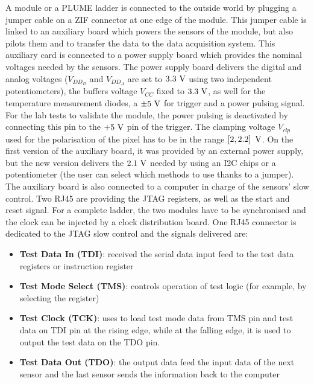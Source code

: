   A module or a PLUME ladder is connected to the outside world by plugging a jumper cable on a ZIF connector at one edge of the module.
  This jumper cable is linked to an auxiliary board which powers the sensors of the module, but also pilots them and to transfer the data to the data acquisition system.
  This auxiliary card is connected to a power supply board which provides the nominal voltages needed by the sensors.
  The power supply board delivers the digital and analog voltages ($V_{DD_D}$ and $V_{DD_A}$ are set to $3.3~\rm{V}$ using two independent potentiometers), the buffers voltage $V_{CC}$ fixed to $3.3~\rm{V}$, as well for the temperature measurement diodes, a $\pm 5~\rm{V}$ for trigger and a power pulsing signal.
  For the lab tests to validate the module, the power pulsing is deactivated by connecting this pin to the $+5~\rm{V}$ pin of the trigger.
  The clamping voltage $V_{clp}$ used for the polarisation of the pixel has to be in the range $\left[2, 2.2\right]~\rm{V}$.
  On the first version of the auxiliary board, it was provided by an external power supply, but the new version delivers the $2.1~\rm{V}$ needed by using an I2C chips or a potentiometer (the user can select which methods to use thanks to a jumper).
  The auxiliary board is also connected to a computer in charge of the sensors' slow control.
  Two RJ45 are providing the \gls{JTAG} registers, as well as the start and reset signal. 
  For a complete ladder, the two modules have to be synchronised and the clock can be injected by a clock distribution board.
  One RJ45 connector is dedicated to the \gls{JTAG} slow control and the signals delivered are: 

  \begin{itemize}
    \item \textbf{Test Data In (TDI)}: received the serial data input feed to the test data registers or instruction register
    \item \textbf{Test Mode Select (TMS)}: controls operation of test logic (for example, by selecting the register)
    \item \textbf{Test Clock (TCK)}: uses to load test mode data from TMS pin and test data on TDI pin at the rising edge, while at the falling edge, it is used to output the test data on the TDO pin.
    \item \textbf{Test Data Out (TDO)}: the output data feed the input data of the next sensor and the last sensor sends the information back to the computer 
  \end{itemize}

